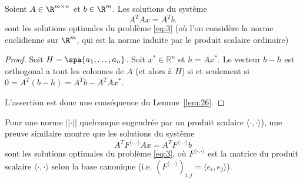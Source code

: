 \begin{theorem}
  \label{thr:6}
  Soient $A \in \R^{m\times n}$ et $b \in \R^m$. Les solutions du système 
  \begin{equation}
    \label{eq:4}    
    A^TAx = A^T b. 
  \end{equation}
  sont les solutions optimales du problème \eqref{eq:3} (où l'on considère la norme euclidienne sur $\R^m$, qui est la norme induite par le produit scalaire ordinaire)
\end{theorem}

\begin{proof}
  Soit $H =  \spa\{a_1,\dots,a_n\}$.
  Soit  $x^* ∈ ℝ^n $ et   $h = Ax^*$. Le vecteur $b- h$ est orthogonal a tout les colonnes de $A$
  (et alors à $H$) si et seulement si $0 = A^T (b-h) = A^T b - A^T A x^*$.  

 L'assertion est donc une conséquence du Lemme~\ref{lem:26}. 
\end{proof}

\begin{remark}
Pour une norme $\lvert\lvert \cdot \rvert\rvert$ quelconque engendrée par un produit scalaire $\langle \cdot , \cdot \rangle$), une preuve similaire montre que les solutions du système
  \begin{equation*}  
    A^TF^{\langle \cdot , \cdot \rangle}Ax = A^T F^{\langle \cdot , \cdot \rangle} b
  \end{equation*}
  sont les solutions  optimales du problème \eqref{eq:3}, où $F^{\langle \cdot , \cdot \rangle}$ est la matrice du produit scalaire $\langle \cdot , \cdot \rangle$ selon la base canonique (i.e. $(F^{\langle \cdot , \cdot \rangle})_{i,j} = \langle e_i , e_j \rangle$).
\end{remark}

